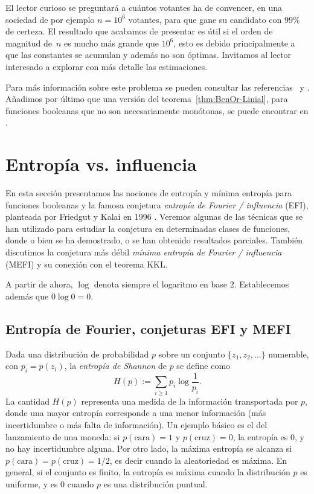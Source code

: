 \documentclass[autocontact]{gaceta}
\begin{document}
El lector curioso se preguntará a cuántos votantes ha de convencer, en una sociedad de por ejemplo $n=10^6$ votantes, para que gane su candidato con $99\%$ de certeza. El resultado que acabamos de presentar es útil si el orden de magnitud de~$n$ es mucho más grande que $10^6$, esto es debido principalmente a que las constantes se acumulan y además no son óptimas. Invitamos al lector interesado a explorar con más detalle las estimaciones.

Para más información sobre este problema se pueden consultar las referencias~\cite{BL85} y \cite[proposición 9.27, p. 265--266]{O'Do21}. Añadimos por último que una versión del teorema~\ref{thm:BenOr-Linial}, para funciones booleanas que no son necesariamente monótonas, se puede encontrar en \cite[ejercicio 9.28]{O'Do21}.

\section{Entropía vs. influencia}\label{sec:EntropyInfluence}

En esta sección presentamos las nociones de entropía y mínima entropía para funciones booleanas y la famosa conjetura \emph{entropía de Fourier / influencia} (EFI), planteada por Friedgut y Kalai en 1996 \cite{FK96}. Veremos algunas de las técnicas que se han utilizado para estudiar la conjetura en determinadas clases de funciones, donde o bien se ha demostrado, o se han obtenido resultados parciales. También discutimos la conjetura más débil \emph{mínima entropía de Fourier / influencia} (MEFI) y su conexión con el teorema KKL.

A partir de ahora, $\log$ denota siempre el logaritmo en base $2$. Establecemos además que $0 \log 0=0$.

\subsection{Entropía de Fourier, conjeturas EFI y MEFI }

Dada una distribución de probabilidad $p$ sobre un conjunto $\{z_1,z_2,\dots\}$ numerable, con $p_i=p(z_i)$, la \emph{entropía de Shannon} de $p$ se define como
\[
H(p):=\sum_{i\geq 1} p_i \log \frac{1}{p_i}.
\]
La cantidad $H(p)$ representa una medida de la información transportada por $p$, donde una mayor entropía corresponde a una menor información (más incertidumbre o más falta de información). Un ejemplo básico es el del lanzamiento de una moneda: si $p(\text{cara})=1$ y $p(\text{cruz})=0$, la entropía es $0$, y no hay incertidumbre alguna. Por otro lado, la máxima entropía se alcanza si $p(\text{cara})= p(\text{cruz})= 1/2$, es decir cuando la aleatoriedad es máxima. En general, si el conjunto es finito, la entropía es máxima cuando la distribución $p$ es uniforme, y es 0 cuando $p$ es una distribución puntual.
\end{document}
